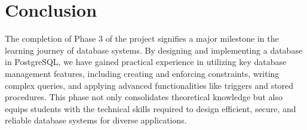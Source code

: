 \section{Conclusion}

The completion of Phase 3 of the project signifies a major milestone in the learning journey of database systems. By designing and implementing a database in PostgreSQL, we have gained practical experience in utilizing key database management features, including creating and enforcing constraints, writing complex queries, and applying advanced functionalities like triggers and stored procedures. This phase not only consolidates theoretical knowledge but also equips students with the technical skills required to design efficient, secure, and reliable database systems for diverse applications.
